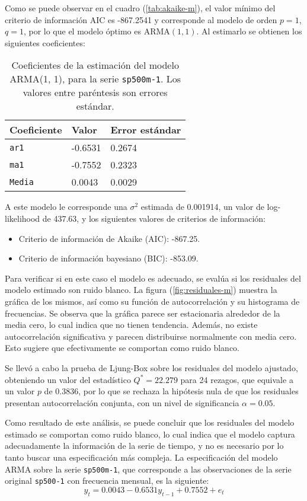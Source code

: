\documentclass{article}
\begin{document}
Como se puede observar en  el cuadro (\ref{tab:akaike-m}), el valor mínimo del criterio de información AIC es -867.2541 y corresponde al modelo de orden $p=1$, $q=1$, por lo que el modelo óptimo es $\mathrm{ARMA}(1, 1)$. Al estimarlo se obtienen los siguientes coeficientes:

\begin{table}[H]
\centering
\begin{tabularx}{0.6\textwidth}{XYY}
\toprule
Coeficiente & Valor & Error estándar \\
\midrule
\texttt{ar1} & -0.6531 & 0.2674 \\
\texttt{ma1} & -0.7552 & 0.2323 \\
\texttt{Media} & 0.0043 & 0.0029 \\
\bottomrule
\end{tabularx}
\caption{\label{tab:arma-m-1-1}Coeficientes de la estimación del modelo ARMA(1, 1), para la serie \texttt{sp500m-1}. Los valores entre paréntesis son errores estándar.}
\end{table}

A este modelo le corresponde una $\sigma^2$ estimada de 0.001914, un valor de log-likelihood de 437.63, y los siguientes valores de criterios de información:
\begin{itemize}
\item Criterio de información de Akaike (AIC): -867.25.
\item Criterio de información bayesiano (BIC): -853.09.
\end{itemize}

Para verificar si en este caso el modelo es adecuado, se evalúa si los residuales del modelo estimado son ruido blanco. La figura (\ref{fig:residuales-m}) muestra la gráfica de los mismos, así como su función de autocorrelación y su histograma de frecuencias. Se observa que la gráfica parece ser estacionaria alrededor de la media cero, lo cual indica que no tienen tendencia. Además, no existe autocorrelación significativa y parecen distribuirse normalmente con media cero. Esto sugiere que efectivamente se comportan como ruido blanco.

Se llevó a cabo la prueba de Ljung-Box sobre los residuales del modelo ajustado, obteniendo un valor del estadístico $Q^* = 22.279$ para 24 rezagos, que equivale a un valor $p$ de 0.3836, por lo que se rechaza la hipótesis nula de que los residuales presentan autocorrelación conjunta, con un nivel de significancia $\alpha = 0.05$.

Como resultado de este análisis, se puede concluir que los residuales del modelo estimado se comportan como ruido blanco, lo cual indica que el modelo captura adecuadamente la información de la serie de tiempo, y no es necesario por lo tanto buscar una especificación más compleja. La especificación del modelo ARMA sobre la serie \texttt{sp500m-1}, que corresponde a las observaciones de la serie original \texttt{sp500-1} con frecuencia mensual, es la siguiente:
\[ y_t = 0.0043 -0.6531 y_{t-1} + 0.7552 + e_t \]
\end{document}
